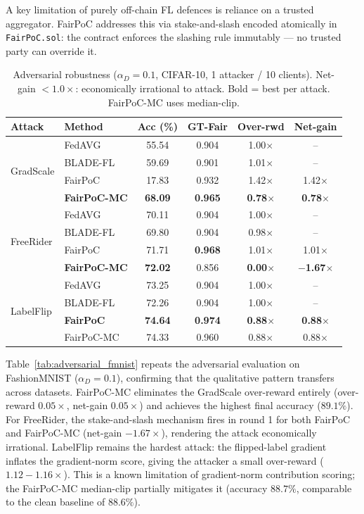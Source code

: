 \documentclass[journal]{IEEEtran}
\theoremstyle{definition}
\theoremstyle{remark}
\begin{document}
A key limitation of purely off-chain FL defences is reliance on a
trusted aggregator.
FairPoC addresses this via stake-and-slash encoded atomically in
\texttt{FairPoC.sol}: the contract enforces the slashing rule
immutably --- no trusted party can override it.

\begin{table}[t]
\caption{Adversarial robustness ($\alpha_D{=}0.1$, CIFAR-10, 1 attacker / 10 clients).
Net-gain ${<}1.0{\times}$: economically irrational to attack.
Bold = best per attack. FairPoC-MC uses median-clip.}
\label{tab:adversarial}
\centering
\renewcommand{\arraystretch}{1.1}
\setlength{\tabcolsep}{3pt}
\begin{tabular}{llcccc}
\toprule
\textbf{Attack} & \textbf{Method} & \textbf{Acc (\%)} & \textbf{GT-Fair} & \textbf{Over-rwd} & \textbf{Net-gain} \\
\midrule
\multirow{4}{*}{GradScale}
 & FedAVG         & 55.54 & 0.904 & 1.00$\times$ & -- \\
 & BLADE-FL       & 59.69 & 0.901 & 1.01$\times$ & -- \\
 & FairPoC        & 17.83 & 0.932 & 1.42$\times$ & 1.42$\times$ \\
 & \textbf{FairPoC-MC} & \textbf{68.09} & \textbf{0.965} & \textbf{0.78}$\times$ & \textbf{0.78}$\times$ \\
\midrule
\multirow{4}{*}{FreeRider}
 & FedAVG         & 70.11 & 0.904 & 1.00$\times$ & -- \\
 & BLADE-FL       & 69.80 & 0.904 & 0.98$\times$ & -- \\
 & FairPoC        & 71.71 & \textbf{0.968} & 1.01$\times$ & 1.01$\times$ \\
 & \textbf{FairPoC-MC} & \textbf{72.02} & 0.856 & \textbf{0.00}$\times$ & \textbf{$-$1.67}$\times$ \\
\midrule
\multirow{4}{*}{LabelFlip}
 & FedAVG         & 73.25 & 0.904 & 1.00$\times$ & -- \\
 & BLADE-FL       & 72.26 & 0.904 & 1.00$\times$ & -- \\
 & \textbf{FairPoC}    & \textbf{74.64} & \textbf{0.974} & \textbf{0.88}$\times$ & \textbf{0.88}$\times$ \\
 & FairPoC-MC     & 74.33 & 0.960 & 0.88$\times$ & 0.88$\times$ \\
\bottomrule
\end{tabular}
\end{table}

Table~\ref{tab:adversarial_fmnist} repeats the adversarial
evaluation on FashionMNIST ($\alpha_D{=}0.1$), confirming that the
qualitative pattern transfers across datasets.
FairPoC-MC eliminates the GradScale over-reward entirely
(over-reward $0.05{\times}$, net-gain $0.05{\times}$) and achieves
the highest final accuracy ($89.1\%$).
For FreeRider, the stake-and-slash mechanism fires in round 1 for
both FairPoC and FairPoC-MC (net-gain $-1.67{\times}$), rendering
the attack economically irrational.
LabelFlip remains the hardest attack: the flipped-label gradient
inflates the gradient-norm score, giving the attacker a small
over-reward ($1.12{-}1.16{\times}$).
This is a known limitation of gradient-norm contribution scoring;
the FairPoC-MC median-clip partially mitigates it
(accuracy $88.7\%$, comparable to the clean baseline of $88.6\%$).
\end{document}
